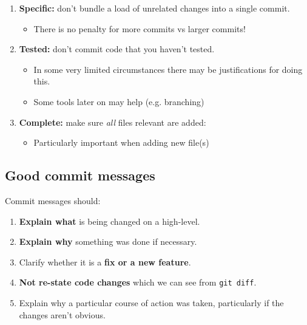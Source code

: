 \documentclass[slides]{pgnotes}
\begin{document}
\begin{enumerate}

\item \textbf{Specific:} don't bundle a load of unrelated changes into a single commit.
  \begin{itemize}
  \item There is no penalty for more commits vs larger commits!
  \end{itemize}

\item \textbf{Tested:} don't commit code that you haven't tested.
  \begin{itemize}
  \item In some very limited circumstances there may be justifications for doing this.
  \item Some tools later on may help (e.g. branching)
  \end{itemize}

\item \textbf{Complete:} make sure \textit{all} files relevant are added:
  \begin{itemize}
  \item Particularly important when adding new file(s)
  \end{itemize}
  
\end{enumerate}

\subsection{Good commit messages}

Commit messages should:
\begin{enumerate}

\item
  \textbf{Explain what} is being changed on a high-level.

\item
  \textbf{Explain why} something was done if necessary.

\item
  Clarify whether it is a \textbf{fix or a new feature}.
  
\item
  \textbf{Not re-state code changes} which we can see from \texttt{git diff}. 

\item
  Explain why a particular course of action was taken, particularly if the changes aren't obvious.
  
\end{enumerate}
\end{document}

